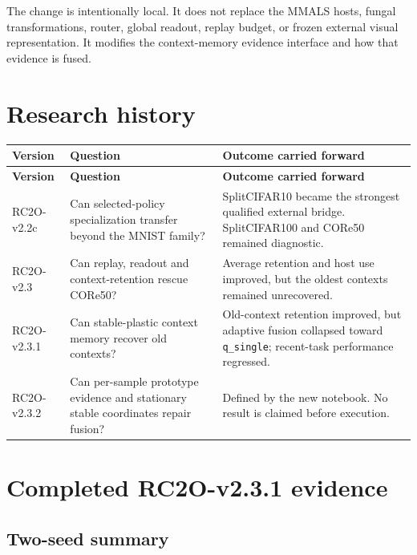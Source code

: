 \documentclass[11pt,a4paper]{article}
\newcommand{\code}[1]{\texttt{#1}}
\begin{document}
The change is intentionally local. It does not replace the MMALS hosts, fungal transformations, router, global readout, replay budget, or frozen external visual representation. It modifies the context-memory evidence interface and how that evidence is fused.

\section{Research history}

\begin{longtable}{p{2.8cm}p{5.2cm}p{6.2cm}}
\toprule
\textbf{Version} & \textbf{Question} & \textbf{Outcome carried forward} \\
\midrule
\endfirsthead
\toprule
\textbf{Version} & \textbf{Question} & \textbf{Outcome carried forward} \\
\midrule
\endhead
RC2O-v2.2c & Can selected-policy specialization transfer beyond the MNIST family? & SplitCIFAR10 became the strongest qualified external bridge. SplitCIFAR100 and CORe50 remained diagnostic. \\
RC2O-v2.3 & Can replay, readout and context-retention rescue CORe50? & Average retention and host use improved, but the oldest contexts remained unrecovered. \\
RC2O-v2.3.1 & Can stable-plastic context memory recover old contexts? & Old-context retention improved, but adaptive fusion collapsed toward \code{q\_single}; recent-task performance regressed. \\
RC2O-v2.3.2 & Can per-sample prototype evidence and stationary stable coordinates repair fusion? & Defined by the new notebook. No result is claimed before execution. \\
\bottomrule
\end{longtable}

\section{Completed RC2O-v2.3.1 evidence}

\subsection{Two-seed summary}
\end{document}
